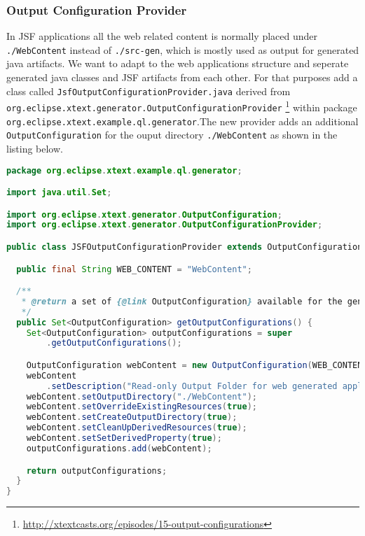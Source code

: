 \subsubsection{Output Configuration Provider}
\label{sec:outputConfigurationProvider}

In JSF applications all the web related content is normally placed under
\texttt{./WebContent} instead of \texttt{./src-gen}, which is mostly used as
output for generated java artifacts. We want to adapt to the web applications
structure and seperate generated java classes and JSF artifacts from each other. For that purposes add
a class called \texttt{JsfOutputConfigurationProvider.java} derived from
\texttt{org.eclipse.xtext.generator.OutputConfigurationProvider} 
\footnote{\url{http://xtextcasts.org/episodes/15-output-configurations}} within package
\texttt{org.eclipse.xtext.example.ql.generator}.The new provider adds an
additional \newline \texttt{OutputConfiguration} for the ouput directory
\texttt{./WebContent} as shown in the listing below.

\begin{lstlisting}[language=Java]
package org.eclipse.xtext.example.ql.generator;

import java.util.Set;

import org.eclipse.xtext.generator.OutputConfiguration;
import org.eclipse.xtext.generator.OutputConfigurationProvider;

public class JSFOutputConfigurationProvider extends OutputConfigurationProvider {

  public final String WEB_CONTENT = "WebContent";

  /**
   * @return a set of {@link OutputConfiguration} available for the generator
   */
  public Set<OutputConfiguration> getOutputConfigurations() {
    Set<OutputConfiguration> outputConfigurations = super
        .getOutputConfigurations();

    OutputConfiguration webContent = new OutputConfiguration(WEB_CONTENT);
    webContent
        .setDescription("Read-only Output Folder for web generated application artifacts");
    webContent.setOutputDirectory("./WebContent");
    webContent.setOverrideExistingResources(true);
    webContent.setCreateOutputDirectory(true);
    webContent.setCleanUpDerivedResources(true);
    webContent.setSetDerivedProperty(true);
    outputConfigurations.add(webContent);

    return outputConfigurations;
  }
}
\end{lstlisting}

